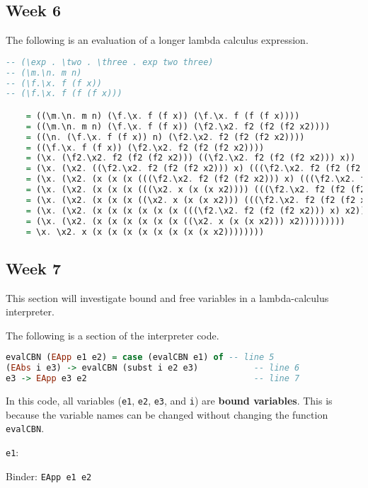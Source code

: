 \documentclass{article}
\theoremstyle{theorem}
\theoremstyle{definition}
\theoremstyle{remark}
\begin{document}
\subsection{Week 6}
The following is an evaluation of a longer lambda calculus expression.

\begin{lstlisting}[language=Haskell]
-- (\exp . \two . \three . exp two three)
-- (\m.\n. m n)
-- (\f.\x. f (f x))
-- (\f.\x. f (f (f x)))

    = ((\m.\n. m n) (\f.\x. f (f x)) (\f.\x. f (f (f x))))
    = ((\m.\n. m n) (\f.\x. f (f x)) (\f2.\x2. f2 (f2 (f2 x2))))
    = ((\n. (\f.\x. f (f x)) n) (\f2.\x2. f2 (f2 (f2 x2))))
    = ((\f.\x. f (f x)) (\f2.\x2. f2 (f2 (f2 x2))))
    = (\x. (\f2.\x2. f2 (f2 (f2 x2))) ((\f2.\x2. f2 (f2 (f2 x2))) x))
    = (\x. (\x2. ((\f2.\x2. f2 (f2 (f2 x2))) x) (((\f2.\x2. f2 (f2 (f2 x2))) x) (((\f2.\x2. f2 (f2 (f2 x2))) x) x2))))
    = (\x. (\x2. (x (x (x (((\f2.\x2. f2 (f2 (f2 x2))) x) (((\f2.\x2. f2 (f2 (f2 x2))) x) x2)))))))
    = (\x. (\x2. (x (x (x (((\x2. x (x (x x2)))) (((\f2.\x2. f2 (f2 (f2 x2))) x) x2)))))))
    = (\x. (\x2. (x (x (x ((\x2. x (x (x x2))) (((\f2.\x2. f2 (f2 (f2 x2))) x) x2)))))))
    = (\x. (\x2. (x (x (x (x (x (x (((\f2.\x2. f2 (f2 (f2 x2))) x) x2)))))))))
    = (\x. (\x2. (x (x (x (x (x (x ((\x2. x (x (x x2))) x2)))))))))
    = \x. \x2. x (x (x (x (x (x (x (x (x x2))))))))
\end{lstlisting}
\subsection{Week 7}
This section will investigate bound and free variables in a lambda-calculus interpreter.

\noindent The following is a section of the interpreter code.
\begin{lstlisting}[language=Haskell]
evalCBN (EApp e1 e2) = case (evalCBN e1) of -- line 5
(EAbs i e3) -> evalCBN (subst i e2 e3)           -- line 6
e3 -> EApp e3 e2                                 -- line 7
\end{lstlisting}

\noindent In this code, all variables (\texttt{e1}, \texttt{e2}, \texttt{e3}, and \texttt{i}) are \textbf{bound variables}. This is because the variable names can be changed without changing the function \texttt{evalCBN}.\newline

\noindent \texttt{e1}:

Binder: \texttt{EApp e1 e2}
\end{document}
